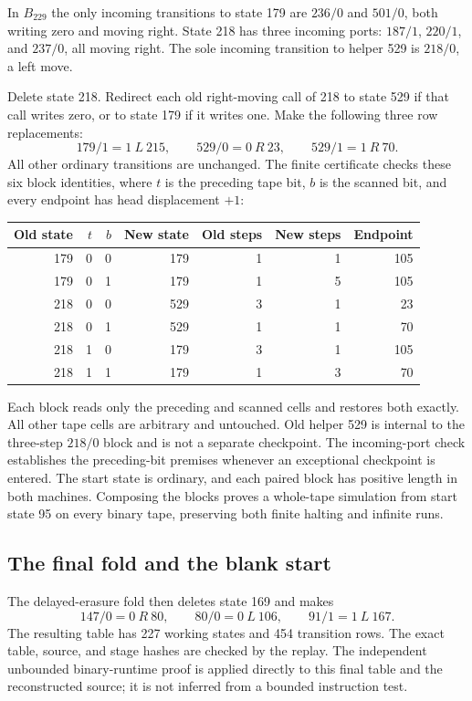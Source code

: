 In $B_{229}$ the only incoming transitions to state 179 are $236/0$ and
$501/0$, both writing zero and moving right.  State 218 has three
incoming ports: $187/1$, $220/1$, and $237/0$, all moving right.  The
sole incoming transition to helper 529 is $218/0$, a left move.

Delete state 218.  Redirect each old right-moving call of 218 to state
529 if that call writes zero, or to state 179 if it writes one.  Make
the following three row replacements:
\[
 179/1=1\ L\ 215,\qquad
 529/0=0\ R\ 23,\qquad 529/1=1\ R\ 70.
\]
All other ordinary transitions are unchanged.  The finite certificate
checks these six block identities, where $t$ is the preceding tape bit,
$b$ is the scanned bit, and every endpoint has head displacement $+1$:
\begin{center}
\begin{tabular}{rrrrrrr}
Old state & $t$ & $b$ & New state & Old steps & New steps & Endpoint\\\hline
179&0&0&179&1&1&105\\
179&0&1&179&1&5&105\\
218&0&0&529&3&1&23\\
218&0&1&529&1&1&70\\
218&1&0&179&3&1&105\\
218&1&1&179&1&3&70
\end{tabular}
\end{center}
Each block reads only the preceding and scanned cells and restores both
exactly.  All other tape cells are arbitrary and untouched.  Old helper
529 is internal to the three-step $218/0$ block and is not a separate
checkpoint.  The incoming-port check establishes the preceding-bit
premises whenever an exceptional checkpoint is entered.  The start state
is ordinary, and each paired block has positive length in both machines.
Composing the blocks proves a whole-tape simulation from start state 95
on every binary tape, preserving both finite halting and infinite runs.

\subsection{The final fold and the blank start}

The delayed-erasure fold then deletes state 169 and makes
\[
 147/0=0\ R\ 80,\qquad
 80/0=0\ L\ 106,\qquad
 91/1=1\ L\ 167.
\]
The resulting table has 227 working states and 454 transition rows.
The exact table, source, and stage hashes are checked by the replay.
The independent unbounded binary-runtime proof is applied directly to
this final table and the reconstructed source; it is not inferred from
a bounded instruction test.

